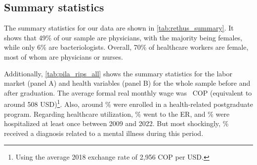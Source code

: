 \documentclass[12pt, a4paper]{article}
\begin{document}
\subsection{Summary statistics}

The summary statistics for our data are shown in \autoref{tab:rethus_summary}. It shows that 49\% of our sample are physicians, with the majority being females, while only 6\% are bacteriologists. Overall, 70\% of healthcare workers are female, most of whom are physicians or nurses.

\begin{table}[H]
  \centering
  \caption{Main sample statistics}
  \label{tab:rethus_summary}%
\end{table}%

Additionally, \autoref{tab:pila_rips_all} shows the summary statistics for the labor market (panel A) and health variables (panel B) for the whole sample before and after graduation. The average formal real monthly wage was \meanwage\ COP (equivalent to around 508 USD)\footnote{Using the average 2018 exchange rate of 2,956 COP per USD.}. %
Also, around \meanpostgrad\% were enrolled in a health-related postgraduate program. Regarding healthcare utilization, \meanurg\% went to the ER, and \meanhosp\% were hospitalized at least once between 2009 and 2022. But most shockingly, \meanmentaldiag\% received a diagnosis related to a mental illness during this period.
\end{document}

